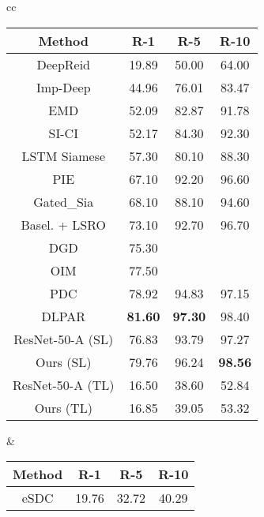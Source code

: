 \documentclass[10pt,letterpaper,twocolumn,10pt,letterpaper,twocolumn]{article}
\providecommand{\tabularnewline}{\\}
\begin{document}
\begin{table*}[t]
\begin{centering}
\begin{tabular}{cc}
\begin{tabular}{c||ccc}
\hline 
{\small{}{}{}Method}  & {\small{}{}{}R-1}  & {\small{}{}{}R-5}  & {\small{}{}{}R-10}\tabularnewline
\hline 
{\small{}{}DeepReid \cite{deepreid}}  & {\small{}{}{}19.89}  & {\small{}{}{}50.00}  & {\small{}{}{}64.00}\tabularnewline
{\small{}{}{}Imp-Deep \cite{Ejaz_cvpr2015}}  & {\small{}{}{}44.96}  & {\small{}{}{}76.01}  & {\small{}{}{}83.47}\tabularnewline
{\small{}{}{}EMD \cite{hailin_shi}}  & {\small{}{}{}52.09}  & {\small{}{}{}82.87}  & {\small{}{}{}91.78}\tabularnewline
{\small{}{}SI-CI \cite{joint_learning_cvpr16}}  & {\small{}{}{}52.17}  & {\small{}{}{}84.30}  & {\small{}{}{}92.30}\tabularnewline
{\small{}{}{}LSTM Siamese \cite{lstm2016eccv}}  & {\small{}{}{}57.30}  & {\small{}{}{}80.10}  & {\small{}{}{}88.30}\tabularnewline
{\small{}{}{}PIE \cite{zheng2017pose}}  & {\small{}{}{}67.10}  & {\small{}{}{}92.20}  & {\small{}{}{}96.60}\tabularnewline
{\small{}{}{}Gated\_Sia \cite{gated_siamese_eccv2016}}  & {\small{}{}{}68.10}  & {\small{}{}{}88.10}  & {\small{}{}{}94.60}\tabularnewline
{\small{}{}{}Basel. + LSRO \cite{zheng2017unlabeled}{}}  & {\small{}{}{}73.10}  & {\small{}{}{}92.70}  & {\small{}{}{}96.70 }\tabularnewline
{\small{}{}{}DGD \cite{xiao2016learning}}  & {\small{}{}{}75.30}  & {\small{}{}{}\textendash{}}  & {\small{}{}{}\textendash{}}\tabularnewline
{\small{}{}{}OIM \cite{xiao2017joint}}  & {\small{}{}{}77.50}  & {\small{}{}{}\textendash{}}  & {\small{}{}{}\textendash{}}\tabularnewline
{\small{}{}{}PDC \cite{su2017pose}}  & {\small{}{}{}78.92}  & {\small{}{}{}94.83}  & {\small{}{}{}97.15}\tabularnewline
{\small{}{}{}DLPAR\cite{zhao2017deeply}}  & {\small{}{}{}}\textbf{\small{}81.60}  & \textbf{\small{}{}{}97.30}\textbf{ } & {\small{}{}{}98.40}\tabularnewline
\hline 
\hline 
{\small{}{}ResNet-50-A} (SL) & {\small{} 76.83}  & {\small{}{}{}{} 93.79}  & {\small{}{}{}{}97.27}\tabularnewline
{\small{}{}{}Ours (SL)}  & {\small{}79.76 } & {\small{}{}{}{}96.24 } & \textbf{\small{}{}{}{}98.56}\tabularnewline
\hline 
\hline 
{\small{}ResNet-50-A (TL)} & 16.50  & 38.60 & 52.84\tabularnewline
Ours (TL) & 16.85 & 39.05 & 53.32\tabularnewline
\hline 
\end{tabular} & \begin{tabular}{c||ccc}
\hline 
{\small{}{}{}Method}  & {\small{}{}{}R-1}  & {\small{}{}{}R-5}  & {\small{}{}{}R-10}\tabularnewline
\hline 
{\small{}{}{}eSDC \cite{unsupervised_per_reid}}  & {\small{}{}{}19.76}  & {\small{}{}{}32.72}  & {\small{}{}{}40.29}\tabularnewline

\end{tabular}
\end{tabular}
\end{centering}
\end{table*}
\end{document}
